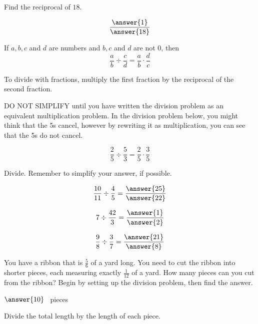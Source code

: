 \documentclass{ximera}[font=12pt]
\begin{document}
\begin{problem}
Find the reciprocal of $18.$

\[ \frac{\answer{1}}{\answer{18}} \] 

\end{problem}


\begin{definition}


If $a, b, c$ and $d$ are numbers and $b, c$ and $d$ are not 0, then
\[ \frac{a}{b} \div \frac{c}{d} = \frac{a}{b} \cdot \frac{d}{c} \]

To divide with fractions, multiply the first fraction by the reciprocal of the second fraction.

\end{definition}

\begin{warning}  
    
DO NOT SIMPLIFY until you have written the division problem as an equivalent multiplication problem.  In the division problem below, 
you might think that the 5s cancel, however by rewriting it as multiplication, you can see that the 5s do not
cancel.

\[ \frac{2}{5} \div \frac{5}{3}  = \frac{2}{5} \cdot \frac{3}{5} \]

\end{warning}

\begin{problem}
Divide. Remember to simplify your answer, if possible.

\[  \frac{10}{11} \div \frac{4}{5} = \frac{\answer{25}}{\answer{22}} \]

\[ 7 \div \frac{42}{3} = \frac{\answer{1}}{\answer{2}} \]

\[ \frac{9}{8} \div \frac{3}{7} = \frac{\answer{21}}{\answer{8}} \]

\end{problem}

\begin{problem}
You have a ribbon that is $\frac{5}{6}$ of a yard long.  You need to cut the ribbon into shorter pieces, each 
measuring exactly $\frac{1}{12}$ of a yard.  How many pieces can you cut from the ribbon?  Begin by setting up  
the division problem, then find the answer.  

\begin{multipleChoice}
\end{multipleChoice}

$\answer{10}$ \ pieces

\begin{hint}
Divide the total length by the length of each piece.
\end{hint}

\end{problem}
\end{document}
